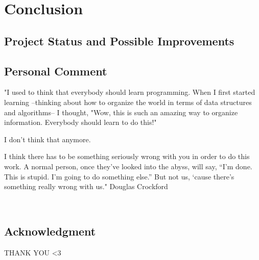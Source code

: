 
\chapter{Conclusion} %

\label{Conclusion} %

\section{Project Status and Possible Improvements}
 


\section{Personal Comment}

"I used to think that everybody should learn programming. When I first started learning –thinking about how to organize the world in terms of data structures and algorithms– I thought, "Wow, this is such an amazing way to organize information. Everybody should learn to do this!"

I don't think that anymore.

I think there has to be something seriously wrong with you in order to do this work. A normal person, once they’ve looked into the abyss, will say, “I’m done. This is stupid. I’m going to do something else.” But not us, ‘cause there’s something really wrong with us."
Douglas Crockford

\

\section{Acknowledgment}
 THANK YOU <3